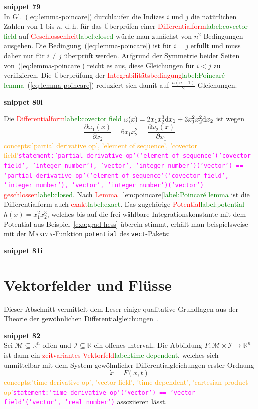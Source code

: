 \documentclass[a4paper,twoside,english,ngerman,deutsch,german,sectrefs,envcountsame,envcountchap]{svmono}
\newcommand{\setref}[2]{\textcolor{red}{#1}\textcolor{green}{#2}}
\newcommand{\snippet}[1]{\textbf{snippet #1}\\}
\newcommand{\eqnote}[2]{\textcolor{orange}{#1}\textcolor{magenta}{\texttt{#2}}}
\begin{document}
\snippet{79}
In Gl.~(\ref{eq:lemma-poincare}) durchlaufen die Indizes $i$ und
$j$ die natürlichen Zahlen von $1$ bis $n$, d.\,h. für das Überprüfen
einer \setref{Differentialform}{label:covector field} auf \setref{Geschlossenheit}{label:closed} würde man zunächst von
$n^{2}$ Bedingungen ausgehen. Die Bedingung~(\ref{eq:lemma-poincare})
ist für $i=j$ erfüllt und muss daher nur für $i\neq j$ überprüft
werden. Aufgrund der Symmetrie beider Seiten von~(\ref{eq:lemma-poincare})
reicht es aus, diese Gleichungen für $i<j$ zu verifizieren. Die Überprüfung
der \setref{Integrabilitätsbedingung}{label:Poincaré lemma}~(\ref{eq:lemma-poincare}) reduziert
sich damit auf $\frac{n(n-1)}{2}$ Gleichungen.

\snippet{80i}
\begin{example}
\label{exa:Integration-Differentialform-Poincare}Die \setref{Differentialform}{label:covector field}
$\omega(x)=2x_{1}x_{2}^{3}\mathrm{d} x_{1}+3x_{1}^{2}x_{2}^{2}\mathrm{d} x_{2}$ ist
wegen
\[
\frac{\partial\omega_{1}(x)}{\partial x_{2}}=6x_{1}x_{2}^{2}=\frac{\partial\omega_{2}(x)}{\partial x_{1}}
\]\eqnote{concepts:'partial derivative op', 'element of sequence', 'covector field'}{statement:'partial derivative op'('element of sequence'('covector field', 'integer number'), 'vector', 'integer number')('vector') == 'partial derivative op'('element of sequence'('covector field', 'integer number'), 'vector', 'integer number')('vector')}
\setref{geschlossen}{label:closed}. Nach \setref{Lemma~\ref{lem:poincare}}{label:Poincaré lemma} ist die Differentialform
auch \setref{exakt}{label:exact}. Das zugehörige \setref{Potential}{label:potential}
$h(x)=x_{1}^{2}x_{2}^{3}$, welches bis auf die frei wählbare Integrationskonstante
mit dem Potential aus Beispiel~\ref{exa:grad-hess}
überein stimmt, erhält man beispielsweise mit der \textsc{Maxima}-Funktion
\texttt{potential} des \texttt{vect}-Pakets:


\end{example}

\snippet{81i}
\section{Vektorfelder und Flüsse\label{sec:Vektorfelder-und-Fluesse}}

Dieser Abschnitt vermittelt dem Leser einige qualitative Grundlagen
aus der Theorie der gewöhnlichen Differentialgleichungen~\cite{arnold2001}.

\snippet{82}
Sei $\mathcal{M}\subseteq{\mathbb{R}}^{n}$ offen und $\mathcal{I}\subseteq{\mathbb{R}}$
ein offenes Intervall. Die Abbildung $F:\mathcal{M}\times\mathcal{I}\to{\mathbb{R}}^{n}$
ist dann ein \setref{zeitvariantes Vektorfeld}{label:time-dependent}, welches sich unmittelbar mit
dem System gewöhnlicher Differentialgleichungen erster Ordnung
\begin{equation}
\dot{x}=F(x,t)\label{eq:dgl1}
\end{equation}\eqnote{concepts:'time derivative op', 'vector field', 'time-dependent', 'cartesian product op'}{statement:'time derivative op'('vector') == 'vector field'('vector', 'real number')}
assoziieren lässt.
\end{document}
